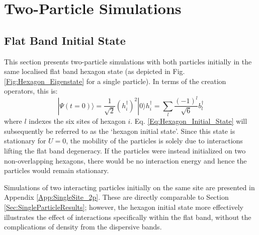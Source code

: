 \chapter{Two-Particle Simulations}\label{Sec:TwoParticleResults}

\section{Flat Band Initial State}\label{Sec:HexagonResults}

This section presents two-particle simulations with both particles initially in the same localised flat band hexagon state (as depicted in Fig. \ref{Fig:Hexagon_Eigenstate} for a single particle). In terms of the creation operators, this is:
\begin{subequations}\label{Eq:Hexagon_Initial_State_and_Operator}
    \begin{equation}\label{Eq:Hexagon_Initial_State}
        |\Psi(t=0)\rangle=\frac{1}{\sqrt{2}}(h_{i}^{\dag})^2|0\rangle
    \end{equation}
    \begin{equation}\label{Eq:Hexagon_Operator}
        h_{i}^\dag=\sum_{l}\frac{(-1)^{l}}{\sqrt{6}}b_{l}^{\dag}
    \end{equation}
\end{subequations}
where $l$ indexes the six sites of hexagon $i$. Eq. \ref{Eq:Hexagon_Initial_State} will subsequently be referred to as the `hexagon initial state'. Since this state is stationary for $U=0$, the mobility of the particles is solely due to interactions lifting the flat band degeneracy. If the particles were instead initialized on two non-overlapping hexagons, there would be no interaction energy and hence the particles would remain stationary. 

Simulations of two interacting particles initially on the same site are presented in Appendix \ref{App:SingleSite_2p}. These are directly comparable to Section \ref{Sec:SingleParticleResults}; however, the hexagon initial state more effectively illustrates the effect of interactions specifically within the flat band, without the complications of density from the dispersive bands.

